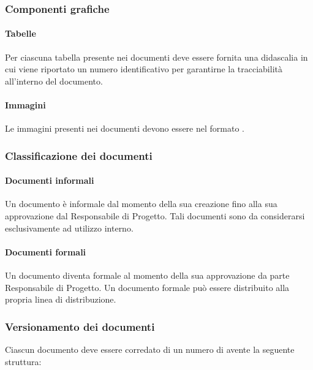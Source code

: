 \subsubsection{Componenti grafiche}
\paragraph*{Tabelle}
Per ciascuna tabella presente nei documenti deve essere fornita una didascalia in cui viene riportato un numero identificativo per garantirne la tracciabilità all'interno del documento.

\paragraph*{Immagini}
Le immagini presenti nei documenti devono essere nel formato .


\subsubsection{Classificazione dei documenti}
\paragraph*{Documenti informali}
Un documento è informale dal momento della sua creazione fino alla sua approvazione dal Responsabile di Progetto. Tali documenti sono da considerarsi esclusivamente ad utilizzo interno.
\paragraph*{Documenti formali}
Un documento diventa formale al momento della sua approvazione da parte Responsabile di Progetto. Un documento formale pu\`o essere distribuito alla propria linea di distribuzione.

\subsubsection{Versionamento dei documenti}
Ciascun documento deve essere corredato di un numero di  avente la seguente struttura:

